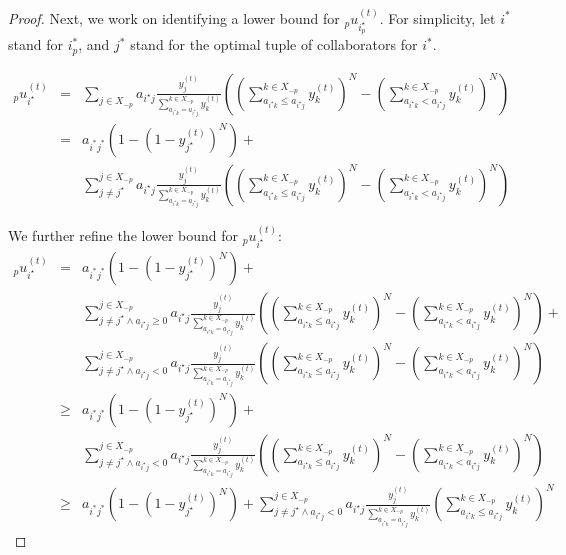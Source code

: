\documentclass{acm_proc_article-sp}
\begin{document}
\begin{proof}
Next, we work on identifying a lower bound for ${_p}u^{(t)}_{i_p^\star}$.  For simplicity, let $i^*$ stand for $i_p^*$, and $j^*$ stand for the optimal tuple of collaborators for $i^*$.

\noindent\begin{eqnarray*}
{_p}u^{(t)}_{i^\star} & = & \sum_{j \in X_{-p}} { a_{i^\star j} \frac{y^{(t)}_j}{ \sum^{k \in X_{-p}}_{a_{i^\star k} = a_{i^\star j}} y^{(t)}_k } \left( \left( \sum^{k \in X_{-p}}_{a_{i^\star k} \leq a_{i^\star j} } y^{(t)}_k \right)^N - \left( \sum^{k \in X_{-p}}_{a_{i^\star k} < a_{i^\star j} } y^{(t)}_k \right)^N \right) }\\
& = & a_{i^* j^*} \left( 1 - \left( 1 - y^{(t)}_{j^\star} \right) ^N \right) +\\
& & \sum^{j \in X_{-p}}_{j \neq j^\star} { a_{i^\star j} \frac{y^{(t)}_j}{ \sum^{k \in X_{-p}}_{a_{i^\star k} = a_{i^\star j} } y^{(t)}_k} \left( \left( \sum^{k \in X_{-p}}_{a_{i^\star k} \leq a_{i^\star j} } y^{(t)}_k \right)^N - \left( \sum^{k \in X_{-p}}_{a_{i^\star k} < a_{i^\star j} } y^{(t)}_k \right)^N \right) }
\end{eqnarray*}

\noindent We further refine the lower bound for ${_p}u^{(t)}_{i^\star}$:
\noindent\begin{eqnarray*}
{_p}u^{(t)}_{i^\star} & = & a_{i^* j^*} \left( 1 - \left( 1 - y^{(t)}_{j^\star} \right) ^N \right) +\\
& & \sum^{j \in X_{-p}}_{j \neq j^\star \wedge a_{i^\star j} \geq 0} { a_{i^\star j} \frac{y^{(t)}_j}{ \sum^{k \in X_{-p}}_{a_{i^\star k} = a_{i^\star j} } y^{(t)}_k} \left( \left( \sum^{k \in X_{-p}}_{a_{i^\star k} \leq a_{i^\star j} } y^{(t)}_k \right)^N - \left( \sum^{k \in X_{-p}}_{a_{i^\star k} < a_{i^\star j} } y^{(t)}_k \right)^N \right) }+\\
& & \sum^{j \in X_{-p}}_{j \neq j^\star \wedge a_{i^\star j} < 0} { a_{i^\star j} \frac{y^{(t)}_j}{ \sum^{k \in X_{-p}}_{a_{i^\star k} = a_{i^\star j} } y^{(t)}_k} \left( \left( \sum^{k \in X_{-p}}_{a_{i^\star k} \leq a_{i^\star j} } y^{(t)}_k \right)^N - \left( \sum^{k \in X_{-p}}_{a_{i^\star k} < a_{i^\star j} } y^{(t)}_k \right)^N \right) }\\
& \geq & a_{i^* j^*} \left( 1 - \left( 1 - y^{(t)}_{j^\star} \right) ^N \right) +\\
& & \sum^{j \in X_{-p}}_{j \neq j^\star \wedge a_{i^\star j} < 0} { a_{i^\star j} \frac{ y^{(t)}_j}{ \sum^{k \in X_{-p}}_{a_{i^\star k} = a_{i^\star j} } y^{(t)}_k} \left( \left( \sum^{k \in X_{-p}}_{a_{i^\star k} \leq a_{i^\star j} } y^{(t)}_k \right)^N - \left( \sum^{k \in X_{-p}}_{a_{i^\star k} < a_{i^\star j} } y^{(t)}_k \right)^N \right) }\\
& \geq & a_{i^* j^*} \left( 1 - \left( 1 - y^{(t)}_{j^\star} \right) ^N \right) + \sum^{j \in X_{-p}}_{j \neq j^\star \wedge a_{i^\star j} < 0} { a_{i^\star j} \frac{ y^{(t)}_j}{ \sum^{k \in X_{-p}}_{a_{i^\star k} = a_{i^\star j} } y^{(t)}_k} \left( \sum^{k \in X_{-p}}_{a_{i^\star k} \leq a_{i^\star j} } y^{(t)}_k \right)^N }
\end{eqnarray*}


\end{proof}
\end{document}
